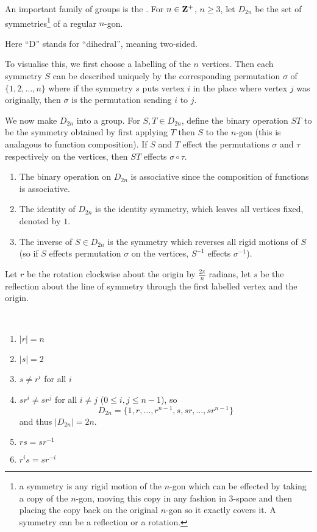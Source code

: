 \begin{example}
An important family of groups is the . For $n\in\mathbf Z^+$, $n\ge3$, let $D_{2n}$ be the set of symmetries\footnote{a symmetry is any rigid motion of the $n$-gon which can be effected by taking a copy of the $n$-gon, moving this copy in any fashion in $3$-space and then placing the copy back on the original $n$-gon so it exactly covers it. A symmetry can be a reflection or a rotation.} of a regular $n$-gon.

\begin{remark}
Here ``D'' stands for ``dihedral'', meaning two-sided.
\end{remark}

To visualise this, we first choose a labelling of the $n$ vertices. Then each symmetry $S$ can be described uniquely by the corresponding permutation $\sigma$ of $\{1,2,\dots,n\}$ where if the symmetry $s$ puts vertex $i$ in the place where vertex $j$ was originally, then $\sigma$ is the permutation sending $i$ to $j$.

We now make $D_{2n}$ into a group. For $S,T\in D_{2n}$, define the binary operation $ST$ to be the symmetry obtained by first applying $T$ then $S$ to the $n$-gon (this is analagous to function composition). If $S$ and $T$ effect the permutations $\sigma$ and $\tau$ respectively on the vertices, then $ST$ effects $\sigma\circ\tau$.

\begin{enumerate}[label=(\roman*)]
\item The binary operation on $D_{2n}$ is associative since the composition of functions is associative.
\item The identity of $D_{2n}$ is the identity symmetry, which leaves all vertices fixed, denoted by $1$.
\item The inverse of $S\in D_{2n}$ is the symmetry which reverses all rigid motions of $S$ (so if $S$ effects permutation $\sigma$ on the vertices, $S^{-1}$ effects $\sigma^{-1}$).
\end{enumerate}

Let $r$ be the rotation clockwise about the origin by $\frac{2\pi}{n}$ radians, let $s$ be the reflection about the line of symmetry through the first labelled vertex and the origin.

\begin{proposition} \
\begin{enumerate}[label=(\roman*)]
\item $|r|=n$
\item $|s|=2$
\item $s\neq r^i$ for all $i$
\item $sr^i\neq sr^j$ for all $i\neq j$ ($0\le i,j\le n-1$), so
\[D_{2n}=\{1,r,\dots,r^{n-1},s,sr,\dots,sr^{n-1}\}\]
and thus $|D_{2n}|=2n$.
\item $rs=sr^{-1}$
\item $r^is=sr^{-i}$
\end{enumerate}
\end{proposition}


\end{example}
